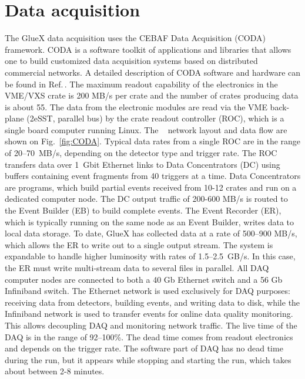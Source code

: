 
\section[Data Acquisition]{Data acquisition \label{sec:daq}}



The GlueX data acquisition uses the CEBAF Data Acquisition (CODA) framework. CODA is a software toolkit of applications and libraries that allows one to build customized data acquisition systems based on distributed commercial networks. A detailed description of CODA software and hardware can be found in Ref.\,\cite{CLAS12DAQ}. 
The maximum readout capability of the electronics in the VME/VXS crate is 200 MB/s per crate and the number of crates producing data is about 55.
The data from the electronic modules are read via the VME back-plane (2eSST, parallel bus) by the crate readout controller (ROC), which is a single board computer running Linux.
The \gx~ network layout and data flow are shown on Fig.~\ref{fig:CODA}.
Typical data rates from a single ROC are in the range of 20--70~MB/s, depending on the detector type and trigger rate.
The ROC transfers data over 1~Gbit Ethernet links to Data Concentrators (DC) using buffers containing event fragments from 40 triggers at a time. Data Concentrators are programs, which build partial events received from 10-12 crates and run on a dedicated computer node.
The DC output traffic of 200-600 MB/s is routed to the Event Builder (EB) to build complete events.
The Event Recorder (ER), which is typically running on the same node as an Event Builder, writes data to local data storage.
To date, GlueX has collected data at a rate of 500--900 MB/s, which allows the ER to write out to a single output stream. The system is expandable to handle higher luminosity with rates of 1.5--2.5~GB/s. In this case, the ER must write multi-stream data to several files in parallel.
All DAQ computer nodes are connected to both a 40 Gb Ethernet switch and a 56 Gb Infiniband switch.
The Ethernet network is used exclusively for DAQ purposes: receiving data from detectors, building events, and writing data to disk, 
while the Infiniband network is used to transfer events for online data quality monitoring. 
This allows decoupling DAQ and monitoring network traffic.
The live time of the DAQ is in the range of 92--100\%. The dead time comes from readout electronics and depends on the trigger rate.  
The software part of DAQ has no dead time during the run, but it appears while stopping and starting the run, which takes about between 2-8 minutes. 



